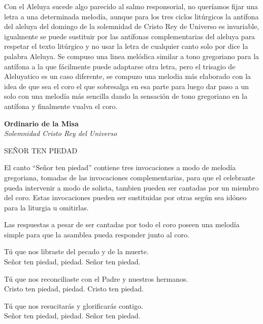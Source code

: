 \documentclass[12pt, letterpaper]{report}
\begin{document}
    Con el Aleluya sucede algo parecido al salmo responsorial, no quer\'iamos fijar una letra a una determinada melod\'ia, aunque para los tres ciclos lit\'urgicos la ant\'ifona del aleluya del domingo de la solemnidad de Cristo Rey de Universo es invariable, igualmente se puede sustituir por las ant\'ifonas complementarias del aleluya para respetar el texto lit\'urgico y no usar la letra de cualquier canto solo por dice la palabra Aleluya. Se compuso una linea mel\'odica similar a tono gregoriano para la ant\'ifona a la que f\'acilmente puede adaptarse otra letra,
    pero el trisagio de Aleluyatico es un caso diferente, se compuzo una melodia m\'as elaborado con la idea de que sea el coro el que sobresalga en esa parte para luego dar paso a un solo con una melod\'ia m\'as sencilla dando la sensaci\'on de tono gregoriano en la ant\'ifona y finalmente vualva el coro.
    \clearpage

    \begin{center}
      \vspace*{8cm}
      \textbf{\Huge Ordinario de la Misa}\\
      \textit{\Large Solemnidad Cristo Rey del Universo}
    \end{center}
    \clearpage

    \begin{center}
      {\large SE\~NOR TEN PIEDAD}
    \end{center}

    El canto ``Se\~nor ten piedad'' contiene tres invocaciones a modo de melod\'ia gregoriana, tomadas de las invocaciones complementarias, para que el celebrante pueda intervenir a modo de solista, tambien pueden ser cantadas por un miembro del coro. Estas invocaciones pueden ser sustituidas por otras seg\'un sea id\'oneo para la liturgia u omitirlas.

    Las respuestas a pesar de ser cantadas por todo el coro poseen una melod\'ia simple para que la asamblea pueda responder junto al coro.

    \noindent
    T\'u que nos libraste del pecado y de la muerte.\\ Se\~nor ten piedad, piedad. Se\~nor ten piedad.

    \noindent
    T\'u que nos reconciliaste con el Padre y nuestros hermanos.\\ Cristo ten piedad, piedad. Cristo ten piedad.

    \noindent
    T\'u que nos resucitar\'as y glorificar\'as contigo.\\ Se\~nor ten piedad, piedad. Se\~nor ten piedad.
    \clearpage
\end{document}
